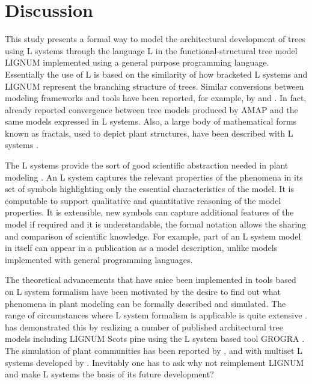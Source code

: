\section{Discussion}

This  study   presents  a  formal  way  to   model  the  architectural
development of  trees using  L systems through  the language L  in the
functional-structural  tree model LIGNUM  implemented using  a general
purpose programming  language.  Essentially the  use of L is  based on
the similarity  of how  bracketed L systems  and LIGNUM  represent the
branching  structure of trees.   Similar conversions  between modeling
frameworks   and   tools  have   been   reported,   for  example,   by
\citet{ferraro:02}   and   \citet{dzierzon:03}.    In  fact,   already
\citet{kurth:em94} reported  convergence between tree  models produced
by AMAP  and the same  models expressed in  L systems.  Also,  a large
body of  mathematical forms  known as fractals,  used to  depict plant
structures, have been described with L systems \citep{kurth:99}.

The L systems  provide the sort of good  scientific abstraction needed
in plant modeling \citep[c.f.][]{regev:02}.   An L system captures the
relevant  properties   of  the  phenomena   in  its  set   of  symbols
highlighting only  the essential characteristics of the  model.  It is
computable to  support qualitative  and quantitative reasoning  of the
model  properties.    It  is  extensible,  new   symbols  can  capture
additional features of the model if required and it is understandable,
the formal  notation allows the  sharing and comparison  of scientific
knowledge.   For example,  part of  an  L system model  in itself  can
appear  in  a  publication  as  a  model  description,  unlike  models
implemented with general programming languages.

The theoretical advancements that have snice been implemented in tools
based on L system formalism have  been motivated by the desire to find
out what  phenomena in  plant modeling can  be formally  described and
simulated.   The range  of circumstances  where L system  formalism is
applicable  is quite  extensive  \citep{pp:99}.  \citet{kurth:99}  has
demonstrated  this by  realizing a  number of  published architectural
tree models including LIGNUM Scots pine \citep{perttunen:96} using the
L system based  tool GROGRA \citep{kurth:94}. The  simulation of plant
communities has been  reported by \citet{deussen:98}, \citet{kurth:99}
and with multiset L  systems developed by \citet{lane:02}.  Inevitably
one has to ask why not reimplement LIGNUM and make L systems the basis
of its future development?


